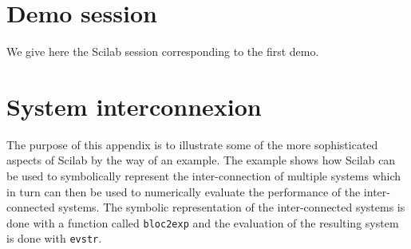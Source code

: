 \appendix
\chapter{Demo session}
We give here the Scilab session corresponding to the first demo.



\chapter{System interconnexion}

	The purpose of this appendix is to illustrate some
of the more sophisticated aspects of Scilab by the way of an example.
The example shows how Scilab can be used to symbolically represent
the inter-connection of multiple systems which in turn can 
then be used to numerically evaluate the performance of the
inter-connected systems.  The symbolic representation of the
inter-connected systems is done with a function called {\tt bloc2exp}
and the evaluation of the resulting system is done with
{\tt evstr}.

